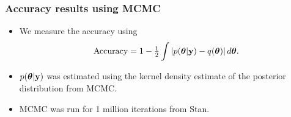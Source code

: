 \documentclass{beamer}
\begin{document}
	
	\begin{frame}
		\frametitle{Accuracy results using MCMC}
		\begin{itemize}
			\item	We measure the accuracy using
			      $$\text{Accuracy} = 1 - \tfrac{1}{2} \int \left |p({\boldsymbol \theta}|{\bf y}) - q({\boldsymbol \theta}) \right | d {\boldsymbol \theta}.$$
			\item	$p({\boldsymbol \theta}|{\bf y})$ was estimated using the kernel density estimate of the posterior
			      distribution from MCMC.
			\item MCMC was run for 1 million iterations from Stan.
		\end{itemize}
	\end{frame}
		
			
\end{document}
